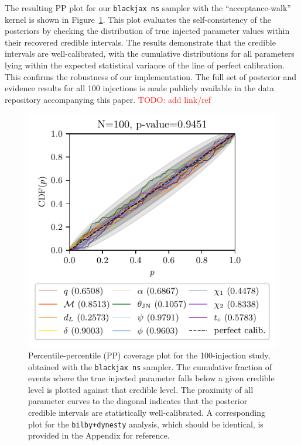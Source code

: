 \documentclass[fleqn,usenatbib]{mnras}
\begin{document}
The resulting PP plot for our \texttt{blackjax ns} sampler
with the ``acceptance-walk'' kernel is shown in Figure~\ref{fig:pp_coverage}.
This plot evaluates the self-consistency of the posteriors by checking
the distribution of true injected parameter values within their
recovered credible intervals. The results demonstrate that the credible
intervals are well-calibrated, with the cumulative distributions for all
parameters lying within the expected statistical variance of the
line of perfect calibration. This confirms the robustness of our implementation. The full
set of posterior and evidence results for all 100 injections is made
publicly available in the data repository accompanying this paper.
\textcolor{red}{TODO: add link/ref}

\begin{figure}
    \centering
    \includegraphics[width=\columnwidth]{figures/pp_coverage_blackjax.pdf}
    \caption{Percentile-percentile (PP) coverage plot for the
    100-injection study, obtained with the \texttt{blackjax ns}
    sampler. The cumulative fraction of events where the true
    injected parameter falls below a given credible level is plotted
    against that credible level. The proximity of all parameter curves
    to the diagonal indicates that the posterior credible intervals
    are statistically well-calibrated. A corresponding plot for the
    \texttt{bilby+dynesty} analysis, which should be identical,
    is provided in the Appendix for reference.}
    \label{fig:pp_coverage}
\end{figure}
\end{document}
